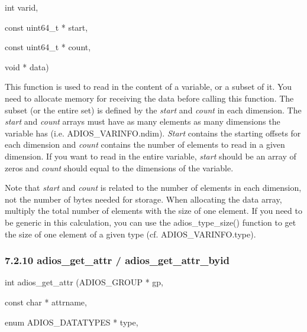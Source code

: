 \vspace{10pt}
\parindent=104pt
int varid,

\vspace{10pt}
const uint64\_t * start, 

\vspace{10pt}
\parindent=208pt
const uint64\_t * count,

\vspace{10pt}
\parindent=104pt
void * data)

\vspace{22pt}
\parindent=0pt
This function is used to read in the content of a variable, or a subset of it. 
You need to allocate memory for receiving the data before calling this function. 
The subset (or the entire set) is defined by the \textit{start} and \textit{count} 
in each dimension. The \textit{start} and \textit{count} arrays must have as many 
elements as many dimensions the variable has (i.e. ADIOS\_VARINFO.ndim). \textit{Start 
}contains the starting offsets for each dimension and \textit{count }contains the 
number of elements to read in a given dimension. If you want to read in the entire 
variable, \textit{start} should be an array of zeros and \textit{count} should 
equal to the dimensions of the variable. 

\vspace{10pt}
Note that \textit{start} and \textit{count} is related to the number of elements 
in each dimension, not the number of bytes needed for storage. When allocating 
the data array, multiply the total number of elements with the size of one element. 
If you need to be generic in this calculation, you can use the adios\_type\_size() 
function to get the size of one element of a given type (cf. ADIOS\_VARINFO.type). 
\label{HToc182553408}

\vspace{10pt}
\subsubsection*{{\large \textbf{7.2.10 adios\_get\_attr / adios\_get\_attr\_byid}}}

\vspace{10pt}
int adios\_get\_attr (ADIOS\_GROUP           * gp,

\vspace{10pt}
\parindent=72pt
const char            * attrname,

\vspace{10pt}
enum ADIOS\_DATATYPES  * type,

